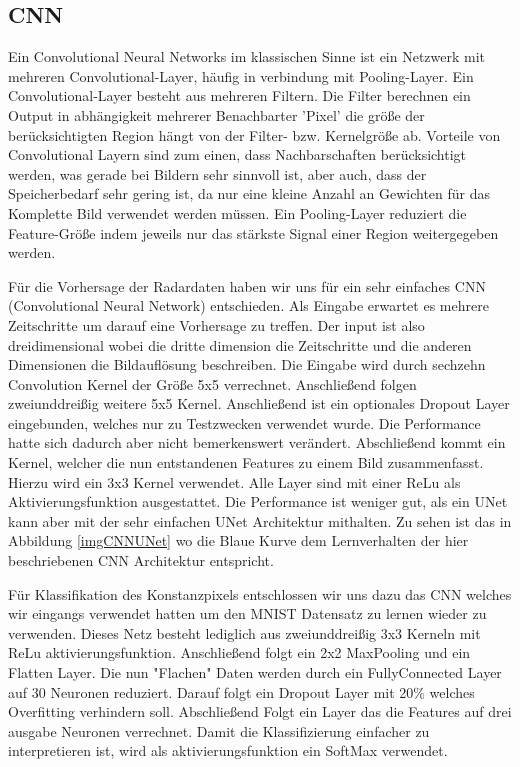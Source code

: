 \subsection{CNN}
\label{kapitelCNN}
Ein Convolutional Neural Networks im klassischen Sinne ist ein Netzwerk mit mehreren Convolutional-Layer, häufig in verbindung mit Pooling-Layer. Ein Convolutional-Layer besteht aus mehreren Filtern. Die Filter berechnen ein Output in abhängigkeit mehrerer Benachbarter 'Pixel' die größe der berücksichtigten Region hängt von der Filter- bzw. Kernelgröße ab.
Vorteile von Convolutional Layern sind zum einen, dass Nachbarschaften berücksichtigt werden, was gerade bei Bildern sehr sinnvoll ist, aber auch, dass der Speicherbedarf sehr gering ist, da nur eine kleine Anzahl an Gewichten für das Komplette Bild verwendet werden müssen.
Ein Pooling-Layer reduziert die Feature-Größe indem jeweils nur das stärkste Signal einer Region weitergegeben werden.

Für die Vorhersage der Radardaten haben wir uns für ein sehr einfaches CNN (Convolutional Neural Network) entschieden.
Als Eingabe erwartet es mehrere Zeitschritte um darauf eine Vorhersage zu treffen. Der input ist also dreidimensional wobei die dritte dimension die Zeitschritte und die anderen Dimensionen die Bildauflösung beschreiben. Die Eingabe wird durch sechzehn Convolution Kernel der Größe 5x5 verrechnet. Anschließend folgen zweiunddreißig weitere 5x5 Kernel. Anschließend ist ein optionales Dropout Layer eingebunden, welches nur zu Testzwecken verwendet wurde. Die Performance hatte sich dadurch aber nicht bemerkenswert verändert. Abschließend kommt ein Kernel, welcher die nun entstandenen Features zu einem Bild zusammenfasst. Hierzu wird ein 3x3 Kernel verwendet. Alle Layer sind mit einer ReLu als Aktivierungsfunktion ausgestattet.
Die Performance ist weniger gut, als ein UNet kann aber mit der sehr einfachen UNet Architektur mithalten. Zu sehen ist das in Abbildung \ref{imgCNNUNet} wo die Blaue Kurve dem Lernverhalten der hier beschriebenen CNN Architektur entspricht.

Für Klassifikation des Konstanzpixels entschlossen wir uns dazu das CNN welches wir eingangs verwendet hatten um den MNIST Datensatz zu lernen wieder zu verwenden. Dieses Netz besteht lediglich aus zweiunddreißig 3x3 Kerneln mit ReLu aktivierungsfunktion. Anschließend folgt ein 2x2 MaxPooling und ein Flatten Layer. Die nun "Flachen" Daten werden durch ein FullyConnected Layer auf 30 Neuronen reduziert. Darauf folgt ein Dropout Layer mit 20\% welches Overfitting verhindern soll. Abschließend Folgt ein Layer das die Features auf drei ausgabe Neuronen verrechnet. Damit die Klassifizierung einfacher zu interpretieren ist, wird als aktivierungsfunktion ein SoftMax verwendet.


